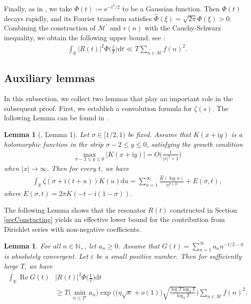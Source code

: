\documentclass[10pt,a4paper]{amsart}
\newtheorem{lem}[thm]{Lemma}
\numberwithin{equation}{section}
\newcommand{\bgl}{\big(}
\newcommand{\bgr}{\big)}
\newcommand{\bggl}{\bigg(}
\newcommand{\bggr}{\bigg)}
\newcommand{\Bgl}{\Big(}
\newcommand{\Bgr}{\Big)}
\newcommand{\lo}{\log_2}
\newcommand{\lt}{\log_3}
\newcommand{\ph}{\Phi}
\newcommand{\mbr}{\mathbb{R}}
\newcommand{\mbn}{\mathbb{N}}
\newcommand{\mcm}{\mathcal{M}}
\newcommand{\mmd}{\mathrm{d}}
\newcommand{\mme}{\mathrm{e}}
\newcommand{\mmi}{\mathrm{i}}
\newcommand{\mit}{\mathrm{i}t}
\newcommand{\re}{\operatorname{Re}}
\newcommand{\whp}{\widehat{\Phi}}
\begin{document}
\par
Finally, as in \cite{bondarenko2017large, bondarenko2018argument}, we take \(\Phi(t) := \mme^{-t^{2}/2}\) to be a Gaussian function. Then \(\ph(t)\) decays rapidly, and its Fourier transform satisfies \(\whp(\xi) = \sqrt{2\pi}\ph(\xi)>0\). Combining the construction of \(\mcm^\prime\) and \(r(n)\) with the Cauchy-Schwarz inequality, we obtain the following upper bound; see \cite[Lemma 5]{bondarenko2018argument}:
\begin{align}
    \label{R2phi-upper}
    \int_{\mbr}|R(t)|^2\Phi \Big( \frac{t}{T} \Big) \mmd t \ll T \sum_{n \in \mcm}f(n)^2.
\end{align}

\subsection{Auxiliary lemmas}
\label{secauxiliary}

In this subsection, we collect two lemmas that play an important role in the subsequent proof. First, we establish a convolution formula for \(\zeta(s)\). The following Lemma can be found in \cite{bondarenko2018argument}.
\begin{lem}[\cite{bondarenko2018argument}, Lemma 1]
    \label{pro1}
    Let \(\sigma \in [1/2,1)\) be fixed. Assume that \(K(x+\mmi y)\) is a holomorphic
function in the strip \(\sigma-2 \le y \le 0\), satisfying the growth condition
\begin{align}
    \label{pro1-growth}
    \max_{\sigma -2\le y \le 0}|K(x+\mmi y)| = O\Bgl \frac{1}{|x|^2+1} \Bgr
\end{align}
when \(|x| \to \infty\). Then for every \(t\), we have
\begin{align}
    \label{pro1-convolution}
    \int_\mbr \zeta(\sigma+\mmi(t+u))K(u)\mmd u = \sum_{n=1}^\infty \frac{\widehat{K}(\log n)}{n^{\sigma+\mit}}+E(\sigma,t),
\end{align}
where \(E(\sigma,t) = 2\pi K(-t-\mmi(1-\sigma))\).
\end{lem}
\par
The following Lemma shows that the resonator \(R(t)\) constructed in Section \ref{secConstucting} yields an effective lower bound for the contribution from Dirichlet series with non-negative coefficients.

\begin{lem}
    \label{pro2}
    For all \(n \in \mbn_+\), let \(a_n \ge 0\). Assume that \(G(t)=\sum_{n=1}^\infty a_n n^{-1/2-\mit}\) is absolutely convergent. Let \(\varepsilon\) be a small positive number. Then for sufficiently large \(T\), we have
    \begin{align*}
        \int_\mbr\re G(t)& |R(t)|^2\ph\Bgl\frac{t}{T} \Bgr \mmd t  \nonumber \\
        &\ge T \bgl\min_{n \le T^\varepsilon} a_n\bgr \exp \bggl \bgl \eta \sqrt{\kappa} +o(1) \bgr \sqrt{\frac{\log T \lt T}{\lo T}}\bggr \sum_{n \in \mcm}f(n)^2.
    \end{align*}
\end{lem}
\end{document}

